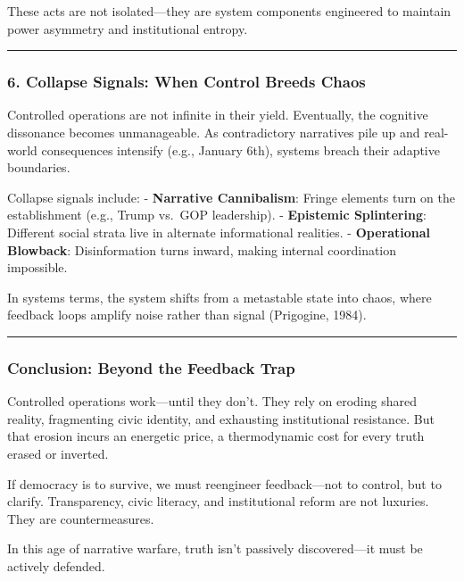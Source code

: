 \documentclass[
]{article}
\begin{document}
These acts are not isolated---they are system components engineered to maintain power asymmetry and institutional entropy.

\begin{center}\rule{0.5\linewidth}{0.5pt}\end{center}

\subsubsection{6. Collapse Signals: When Control Breeds Chaos}\label{collapse-signals-when-control-breeds-chaos}

Controlled operations are not infinite in their yield. Eventually, the cognitive dissonance becomes unmanageable. As contradictory narratives pile up and real-world consequences intensify (e.g., January 6th), systems breach their adaptive boundaries.

Collapse signals include:
- \textbf{Narrative Cannibalism}: Fringe elements turn on the establishment (e.g., Trump vs.~GOP leadership).
- \textbf{Epistemic Splintering}: Different social strata live in alternate informational realities.
- \textbf{Operational Blowback}: Disinformation turns inward, making internal coordination impossible.

In systems terms, the system shifts from a metastable state into chaos, where feedback loops amplify noise rather than signal (Prigogine, 1984).

\begin{center}\rule{0.5\linewidth}{0.5pt}\end{center}

\subsubsection{Conclusion: Beyond the Feedback Trap}\label{conclusion-beyond-the-feedback-trap}

Controlled operations work---until they don't. They rely on eroding shared reality, fragmenting civic identity, and exhausting institutional resistance. But that erosion incurs an energetic price, a thermodynamic cost for every truth erased or inverted.

If democracy is to survive, we must reengineer feedback---not to control, but to clarify. Transparency, civic literacy, and institutional reform are not luxuries. They are countermeasures.

In this age of narrative warfare, truth isn't passively discovered---it must be actively defended.
\end{document}
